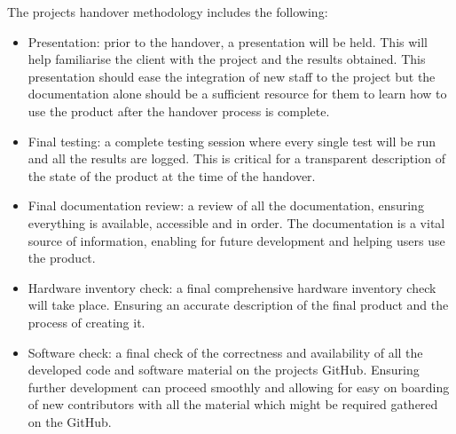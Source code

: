 The projects handover methodology includes the following:
\begin{itemize}
    \item Presentation: prior to the handover, a presentation will be held. This will help familiarise the client with the project and the results obtained. This presentation should ease the integration of new staff to the project but the documentation alone should be a sufficient resource for them to learn how to use the product after the handover process is complete.
    \item Final testing: a complete testing session where every single test will be run and all the results are logged. This is critical for a transparent description of the state of the product at the time of the handover.
    \item Final documentation review: a review of all the documentation, ensuring everything is available, accessible and in order. The documentation is a vital source of information, enabling for future development and helping users use the product.
    \item Hardware inventory check: a final comprehensive hardware inventory check will take place. Ensuring an accurate description of the final product and the process of creating it.
    \item Software check: a final check of the correctness and availability of all the developed code and software material on the projects GitHub. Ensuring further development can proceed smoothly and allowing for easy on boarding of new contributors with all the material which might be required gathered on the GitHub.
\end{itemize}

